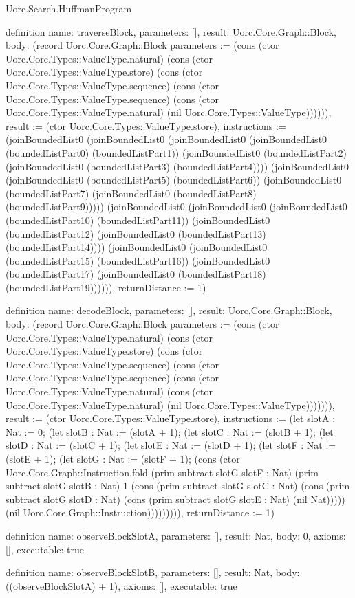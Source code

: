 \begin{lexlean}{Uorc.Search.HuffmanProgram}
\begin{semanticmodule}
definition{
  name: traverseBlock,
  parameters: [],
  result: Uorc.Core.Graph::Block,
  body: (record Uorc.Core.Graph::Block {parameters := (cons (ctor Uorc.Core.Types::ValueType.natural) (cons (ctor Uorc.Core.Types::ValueType.store) (cons (ctor Uorc.Core.Types::ValueType.sequence) (cons (ctor Uorc.Core.Types::ValueType.sequence) (cons (ctor Uorc.Core.Types::ValueType.natural) (nil Uorc.Core.Types::ValueType)))))), result := (ctor Uorc.Core.Types::ValueType.store), instructions := (joinBoundedList0 (joinBoundedList0 (joinBoundedList0 (joinBoundedList0 (boundedListPart0) (boundedListPart1)) (joinBoundedList0 (boundedListPart2) (joinBoundedList0 (boundedListPart3) (boundedListPart4)))) (joinBoundedList0 (joinBoundedList0 (boundedListPart5) (boundedListPart6)) (joinBoundedList0 (boundedListPart7) (joinBoundedList0 (boundedListPart8) (boundedListPart9))))) (joinBoundedList0 (joinBoundedList0 (joinBoundedList0 (boundedListPart10) (boundedListPart11)) (joinBoundedList0 (boundedListPart12) (joinBoundedList0 (boundedListPart13) (boundedListPart14)))) (joinBoundedList0 (joinBoundedList0 (boundedListPart15) (boundedListPart16)) (joinBoundedList0 (boundedListPart17) (joinBoundedList0 (boundedListPart18) (boundedListPart19)))))), returnDistance := 1})
}

definition{
  name: decodeBlock,
  parameters: [],
  result: Uorc.Core.Graph::Block,
  body: (record Uorc.Core.Graph::Block {parameters := (cons (ctor Uorc.Core.Types::ValueType.natural) (cons (ctor Uorc.Core.Types::ValueType.store) (cons (ctor Uorc.Core.Types::ValueType.sequence) (cons (ctor Uorc.Core.Types::ValueType.sequence) (cons (ctor Uorc.Core.Types::ValueType.natural) (cons (ctor Uorc.Core.Types::ValueType.natural) (nil Uorc.Core.Types::ValueType))))))), result := (ctor Uorc.Core.Types::ValueType.store), instructions := (let slotA : Nat := 0; (let slotB : Nat := (slotA + 1); (let slotC : Nat := (slotB + 1); (let slotD : Nat := (slotC + 1); (let slotE : Nat := (slotD + 1); (let slotF : Nat := (slotE + 1); (let slotG : Nat := (slotF + 1); (cons (ctor Uorc.Core.Graph::Instruction.fold (prim subtract slotG slotF : Nat) (prim subtract slotG slotB : Nat) 1 (cons (prim subtract slotG slotC : Nat) (cons (prim subtract slotG slotD : Nat) (cons (prim subtract slotG slotE : Nat) (nil Nat))))) (nil Uorc.Core.Graph::Instruction))))))))), returnDistance := 1})
}

definition{
  name: observeBlockSlotA,
  parameters: [],
  result: Nat,
  body: 0,
  axioms: [],
  executable: true
}

definition{
  name: observeBlockSlotB,
  parameters: [],
  result: Nat,
  body: ((observeBlockSlotA) + 1),
  axioms: [],
  executable: true
}


\end{semanticmodule}
\end{lexlean}
